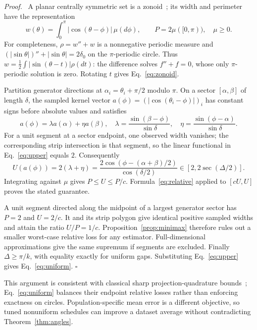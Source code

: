 \documentclass[11pt,a4paper]{article}
\newenvironment{proof}{\par\noindent\textit{Proof.}\ }{\hfill$\square$\par\medskip}
\begin{document}
\begin{proof}
A planar centrally symmetric set is a zonoid~\cite{schneider}; its width and perimeter have the representation
\begin{equation}
w(\theta)=\int_0^\pi|\cos(\theta-\phi)|\,\mu(d\phi),\qquad P=2\mu([0,\pi)),\quad\mu\ge0.
\label{eq:zonoid}
\end{equation}
For completeness, $\rho=w''+w$ is a nonnegative periodic measure and $(|\sin\theta|)''+|\sin\theta|=2\delta_0$ on the $\pi$-periodic circle. Thus $w=\tfrac12\int|\sin(\theta-t)|\rho(dt)$: the difference solves $f''+f=0$, whose only $\pi$-periodic solution is zero. Rotating $t$ gives Eq.~\eqref{eq:zonoid}.

Partition generator directions at $\alpha_i=\theta_i+\pi/2$ modulo $\pi$. On a sector $[\alpha,\beta]$ of length $\delta$, the sampled kernel vector $a(\phi)=(|\cos(\theta_i-\phi)|)_i$ has constant signs before absolute values and satisfies
\begin{equation}
a(\phi)=\lambda a(\alpha)+\eta a(\beta),\quad
\lambda=\frac{\sin(\beta-\phi)}{\sin\delta},\quad
\eta=\frac{\sin(\phi-\alpha)}{\sin\delta}.
\end{equation}
For a unit segment at a sector endpoint, one observed width vanishes; the corresponding strip intersection is that segment, so the linear functional in Eq.~\eqref{eq:upper} equals $2$. Consequently
\[
U(a(\phi))=2(\lambda+\eta)
=\frac{2\cos(\phi-(\alpha+\beta)/2)}{\cos(\delta/2)}
\in[2,2\sec(\Delta/2)].
\]
Integrating against $\mu$ gives $P\le U\le P/c$. Formula~\eqref{eq:relative} applied to $[cU,U]$ proves the stated guarantee.

A unit segment directed along the midpoint of a largest generator sector has $P=2$ and $U=2/c$. It and its strip polygon give identical positive sampled widths and attain the ratio $U/P=1/c$. Proposition~\ref{prop:minimax} therefore rules out a smaller worst-case relative loss for any estimator. Full-dimensional approximations give the same supremum if segments are excluded. Finally $\Delta\ge\pi/k$, with equality exactly for uniform gaps. Substituting Eq.~\eqref{eq:upper} gives Eq.~\eqref{eq:uniform}.
\end{proof}

This argument is consistent with classical sharp projection-quadrature bounds~\cite{kiderlen}; Eq.~\eqref{eq:uniform} balances their endpoint relative losses rather than enforcing exactness on circles. Population-specific mean error is a different objective, so tuned nonuniform schedules can improve a dataset average without contradicting Theorem~\ref{thm:angles}.
\end{document}
